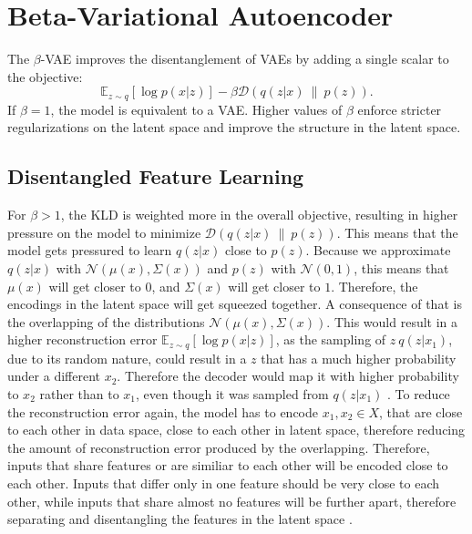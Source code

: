 \documentclass[a4paper]{IEEEtran}
\begin{document}
{\section{Beta-Variational Autoencoder}
The $\beta$-VAE \cite{higgins2017vae} improves the disentanglement of VAEs by adding a single scalar to the objective:
\begin{equation}
	\mathbb{E}_{z \sim q}\left[ \log p(x|z) \right] - \beta \mathcal{D}(q(z|x) \ \| \ p(z)).
\end{equation}
If $\beta = 1$, the model is equivalent to a VAE. Higher values of $\beta$ enforce stricter regularizations on the latent space and improve the structure in the latent space. 

\subsection{Disentangled Feature Learning}
For $\beta > 1$, the KLD is weighted more in the overall objective, resulting in higher pressure on the model to minimize $\mathcal{D}(q(z|x) \ \| \ p(z))$. This means that the model gets pressured to learn $q(z|x)$ close to $p(z)$. Because we approximate $q(z|x)$ with $\mathcal{N}(\mu(x), \Sigma(x))$ and $p(z)$ with $\mathcal{N}(0, 1)$, this means that $\mu(x)$ will get closer to $0$, and $\Sigma(x)$ will get closer to $1$. Therefore, the encodings in the latent space will get squeezed together. A consequence of that is the overlapping of the distributions $\mathcal{N}(\mu(x), \Sigma(x))$. This would result in a higher reconstruction error $\mathbb{E}_{z \sim q}\left[ \log p(x|z) \right]$, as the sampling of $z ~ q(z|x_1)$, due to its random nature, could result in a $z$ that has a much higher probability under a different $x_2$. Therefore the decoder would map it with higher probability to $x_2$ rather than to $x_1$, even though it was sampled from $q(z|x_1)$ \cite{burgess2018understanding}. To reduce the reconstruction error again, the model has to encode $x_1, x_2 \in X$, that are close to each other in data space, close to each other in latent space, therefore reducing the amount of reconstruction error produced by the overlapping. Therefore, inputs that share features or are similiar to each other will be encoded close to each other. Inputs that differ only in one feature should be very close to each other, while inputs that share almost no features will be further apart, therefore separating and disentangling the features in the latent space \cite{burgess2018understanding}.


}
\end{document}
